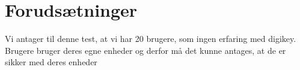 \documentclass[12pt]{article}
\begin{document}

\clearpage\maketitle
\thispagestyle{empty}

\newpage


\thispagestyle{empty}

\pagestyle{plain}
\setcounter{page}{1}

\section*{Forudsætninger}
Vi antager til denne test, at vi har 20 brugere, som ingen erfaring med digikey.\\
Brugere bruger deres egne enheder og derfor må det kunne antages, at de er sikker med deres enheder
\end{document}

